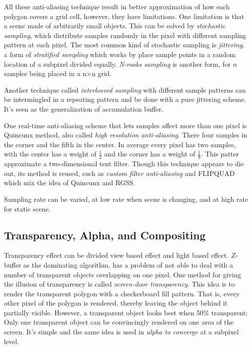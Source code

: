 \documentclass[10pt, a4paper]{article}
\begin{document}
                    All these anti-aliasing technique result in better approximation of how each polygon covers a grid cell, however, they have limitations. One limitation is that a scene made of arbitrarily small objects. This can be solved by \emph{stochastic sampling}, which distribute samples randomly in the pixel with different sampling pattern at each pixel. The most common kind of stochastic sampling is \emph{jittering}, a form of \emph{stratified sampling} which works by place sample points in a random location of a subpixel divided equally. \emph{N-rooks sampling} is another form, for $n$ samples being placed in a  n$ \times $n grid. 
                    
                    Another technique called \emph{interleaved sampling} with different sample patterns can be intermingled in a repeating pattern and be done with a pure jittering scheme. It's seen as the generalization of accumulation buffer. 
                    
                    One real-time anti-aliasing scheme that lets samples affect more than one pixel is Quincunx method, also called \emph{high resolution anti-aliasing}. There four samples in the corner and the fifth in the center. In average every pixel has two samples, with the center has a weight of $\frac{1}{2}$ and the corner has a weight of $\frac{1}{8}$. This patter approximate a two-dimensional tent filter. Though this technique appears to die out, its method is reused, such as \emph{custom filter anti-aliasing} and FLIPQUAD which mix the idea of Quincunx and RGSS. 

                    Sampling rate can be varied, at low rate when scene is changing, and at high rate for static scene. 

        \subsection{Transparency, Alpha, and Compositing} 
            Transparency effect can be divided view based effect and light based effect. $Z$-buffer as the dominating algorithm, has a problem of not able to deal with a number of transparent objects overlapping on one pixel. One method for giving the illusion of transparency is called \emph{screen-door transparency}. This idea is to render the transparent polygon with a checkerboard fill pattern. That is, every other pixel of the polygon is rendered, thereby leaving the object behind it partially visible. However, a transparent object looks best when 50\% transparent; Only one transparent object can be convincingly rendered on one area of the screen. It's simple and the same idea is used in \emph{alpha to converge} at a subpixel level. 
\end{document}
